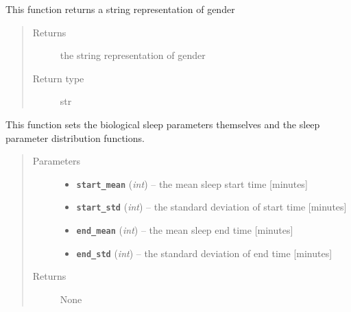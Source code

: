 \documentclass[letterpaper,10pt,english]{sphinxmanual}
\begin{document}
\begin{fulllineitems}
\begin{fulllineitems}
\end{fulllineitems}


\begin{fulllineitems}
\label{bio:bio.Bio.print_gender}
This function returns a string representation of gender
\begin{quote}\begin{description}
\item[{Returns}] \leavevmode
the string representation of gender

\item[{Return type}] \leavevmode
str

\end{description}\end{quote}

\end{fulllineitems}


\begin{fulllineitems}
\label{bio:bio.Bio.set_sleep_params}
This function sets the biological sleep parameters themselves and the sleep parameter distribution functions.
\begin{quote}\begin{description}
\item[{Parameters}] \leavevmode\begin{itemize}
\item {} 
\textbf{\texttt{start\_mean}} (\emph{int}) -- the mean sleep start time {[}minutes{]}

\item {} 
\textbf{\texttt{start\_std}} (\emph{int}) -- the standard deviation of start time {[}minutes{]}

\item {} 
\textbf{\texttt{end\_mean}} (\emph{int}) -- the mean sleep end time {[}minutes{]}

\item {} 
\textbf{\texttt{end\_std}} (\emph{int}) -- the standard deviation of end time {[}minutes{]}

\end{itemize}

\item[{Returns}] \leavevmode
None


\end{description}
\end{quote}
\end{fulllineitems}
\end{fulllineitems}
\end{document}
